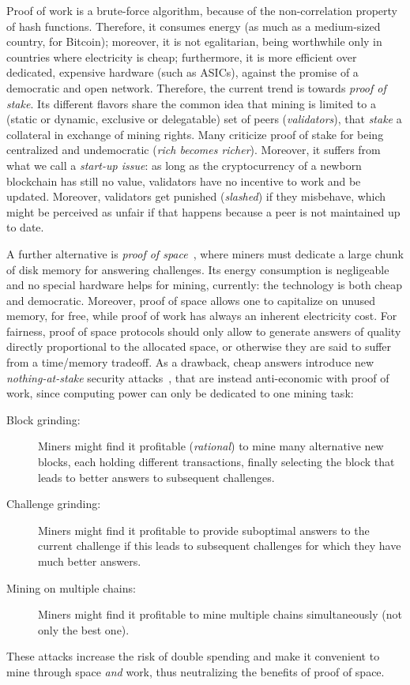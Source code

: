 Proof of work is a brute-force algorithm,
because of the non-correlation property of hash functions.
Therefore, it consumes energy (as much as a medium-sized country, for Bitcoin);
moreover, it is not egalitarian, being
worthwhile only in countries where electricity is cheap; furthermore, it
is more efficient over dedicated, expensive hardware (such as ASICs),
against the promise of a democratic and open network.
Therefore, the current trend is towards \emph{proof of stake}.
Its different flavors share the common idea that mining is limited
to a (static or dynamic, exclusive or delegatable)
set of peers (\emph{validators}), that \emph{stake} a collateral in exchange of mining rights.
Many criticize proof of stake for being centralized and undemocratic
(\emph{rich becomes richer}).
Moreover, it suffers from what we call a \emph{start-up issue}: as long as the cryptocurrency
of a newborn blockchain has still no value, validators have no incentive to work
and be updated. Moreover, validators get punished (\emph{slashed}) if they misbehave, which
might be perceived as unfair if that happens because a peer is not maintained up to date.

A further alternative is \emph{proof of space}~\cite{AtenieseBFG14,DziembowskiFKP15}, where
miners must dedicate a large chunk of disk memory for answering challenges.
Its energy consumption is negligeable and no special
hardware helps for mining, currently: the technology is both cheap
and democratic. Moreover, proof of space allows
one to capitalize on unused memory, for free, while proof of work has always an
inherent electricity cost.
For fairness, proof of space protocols should only allow to generate answers of
quality directly proportional to the allocated space, or otherwise they are said
to suffer from a time/memory tradeoff. As a drawback,
cheap answers introduce new \emph{nothing-at-stake} security
attacks~\cite{ParkKFGAP18}, that are instead anti-economic with proof of work,
since computing power can only be dedicated to one mining task:
%
\begin{description}
\item[Block grinding:] Miners might find it profitable (\emph{rational})
  to mine many alternative new blocks, each holding
  different transactions, finally selecting the block that leads to better answers
  to subsequent challenges.
\item[Challenge grinding:] Miners might find it profitable
  to provide suboptimal answers to the current challenge if
  this leads to subsequent challenges for which they have much better answers.
\item[Mining on multiple chains:] Miners might find it profitable
  to mine multiple chains simultaneously (not only the best one).
\end{description}
%
These attacks increase the risk of double spending and make it convenient
to mine through space \emph{and} work, thus neutralizing the benefits of proof of space.

